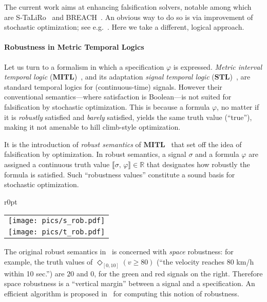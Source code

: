 \documentclass[envcountsect,orivec]{llncs} \usepackage{etex} \usepackage[]{graphicx}
\newcommand{\R}{{\mathbb{R}}}
\newcommand{\DiaOp}[1]{\Diamond_{#1}}
\newcommand{\Robust}[2]{{ \llbracket #1,\, #2 \rrbracket}}
\begin{document}
The current work aims at enhancing falsification solvers, notable among which are
S-TaLiRo~\cite{DBLP:conf/tacas/AnnpureddyLFS11}
and
BREACH~\cite{DBLP:conf/cav/Donze10}. 
An obvious way to do so is via improvement of stochastic optimization;
see e.g.~\cite{Sankaranarayanan:2012:FTP:2185632.2185653,Zutshi:2014:MSC:2656045.2656061}. Here we take a different, logical approach.

\paragraph{Robustness in Metric Temporal Logics}
Let us turn to a formalism in which a specification
$\varphi$ is expressed. 
\emph{Metric interval temporal logic} 
($\textbf{MITL}$)~\cite{DBLP:dblp_journals/jacm/AlurFH96}, 
and its adaptation
\emph{signal temporal logic} 
($\textbf{STL}$)~\cite{DBLP:conf/formats/MalerN04}, 
are standard temporal logics for (continuous-time) signals. 
However their conventional
semantics---where satisfaction is Boolean---is not suited for
falsification by stochastic optimization. 
This is because a formula $\varphi$, no matter if it is 
\emph{robustly} satisfied and \emph{barely} satisfied, yields the same
truth value (``true''), making it  not amenable to hill climb-style
optimization.

It is  the introduction of \emph{robust semantics} of
$\textbf{MITL}$~\cite{DBLP:journals/tcs/FainekosP09} that set off the idea of falsification by
optimization. In robust semantics,  a signal $\sigma$ and a
formula $\varphi$ are assigned a continuous truth value $\Robust{\sigma}{\varphi}\in\R$
that designates how robustly the formula is satisfied. Such ``robustness
values'' constitute a sound basis for stochastic optimization.

\begin{wrapfigure}[10]{r}{0pt}
\centering
  \begin{tabular}{c}
    \texttt{[image: pics/s\_rob.pdf]}
    \\[-2.5em]
    \texttt{[image: pics/t\_rob.pdf]}
  \end{tabular}
\end{wrapfigure}
The original
robust semantics in~\cite{DBLP:journals/tcs/FainekosP09} is concerned with
\emph{space} robustness: for example, the truth values of 
$\DiaOp{[0, 10]}(v \geq 80)$ (``the velocity reaches 80 km/h within 10 sec.'')
are $20$ and $0$, for the green and red signals on the right. Therefore
space
robustness is a ``vertical margin'' between a signal and a
specification. An efficient algorithm is proposed in~\cite{DBLP:conf/cav/DonzeFM13} for computing this
notion of robustness.
\end{document}
